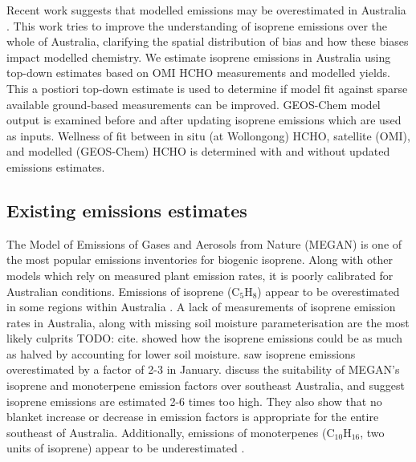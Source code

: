     
    Recent work suggests that modelled emissions may be overestimated in Australia \parencite{Emmerson2016}.
    This work tries to improve the understanding of isoprene emissions over the whole of Australia, clarifying the spatial distribution of bias and how these biases impact modelled chemistry.
    We estimate isoprene emissions in Australia using top-down estimates based on OMI HCHO measurements and modelled yields.
    This a postiori top-down estimate is used to determine if model fit against sparse available ground-based measurements can be improved.
    GEOS-Chem model output is examined before and after updating isoprene emissions which are used as inputs.
    Wellness of fit between in situ (at Wollongong) HCHO, satellite (OMI), and modelled (GEOS-Chem) HCHO is determined with and without updated emissions estimates.
    
  \subsection{Existing emissions estimates}
    
    
    The Model of Emissions of Gases and Aerosols from Nature (MEGAN) is one of the most popular emissions inventories for biogenic isoprene.
    Along with other models which rely on measured plant emission rates, it is poorly calibrated for Australian conditions.
    Emissions of isoprene (C$_5$H$_8$) appear to be overestimated in some regions within Australia \parencite{Sindelarova2014,Stavrakou2014,Emmerson2016}.
    A lack of measurements of isoprene emission rates in Australia, along with missing soil moisture parameterisation are the most likely culprits TODO: cite.
    \textcite{Sindelarova2014} showed how the isoprene emissions could be as much as halved by accounting for lower soil moisture.
    \textcite{Stavrakou2015} saw isoprene emissions overestimated by a factor of 2-3 in January.
    \textcite{Emmerson2016} discuss the suitability of MEGAN's isoprene and monoterpene emission factors over southeast Australia, and suggest isoprene emissions are estimated 2-6 times too high.
    They also show that no blanket increase or decrease in emission factors is appropriate for the entire southeast of Australia.
    Additionally, emissions of monoterpenes (C$_{10}$H$_{16}$, two units of isoprene) appear to be underestimated \parencite{Emmerson2016}.
    

